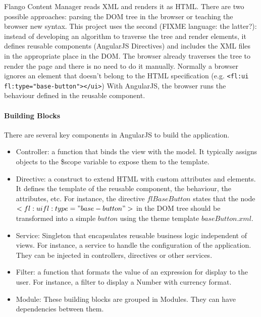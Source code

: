 Flango Content Manager reads \ac{XML} and renders it as \ac{HTML}.
There are two possible approaches: parsing the \ac{DOM} tree in the browser or teaching the browser new syntax.
This project uses the second (FIXME language: the latter?): instead of developing an algorithm to traverse the tree and render elements, it defines reusable components (AngularJS Directives) and includes the \ac{XML} files in the appropriate place in the \ac{DOM}. 
The browser already traverses the tree to render the page and there is no need to do it manually.
Normally a browser ignores an element that doesn't belong to the \ac{HTML} specification (e.g. \lstinline$<fl:ui fl:type="base-button"></ui>$)
With AngularJS, the browser runs the behaviour defined in the reusable component.

\paragraph{Building Blocks} There are several key components in AngularJS to build the application.

\begin{itemize}
    \item Controller: a function that binds the view with the model. It typically assigns objects to the \$scope variable to expose them to the template.
    \item Directive: a construct to extend HTML with custom attributes and elements. It defines the template of the reusable component, the behaviour, the attributes, etc. For instance, the directive $flBaseButton$ states that the node $<fl:ui fl:type="base-button">$ in the \ac{DOM} tree should be transformed into a simple $button$ using the theme template $baseButton.xml$. 
    \item Service: Singleton that encapsulates reusable business logic independent of views. For instance, a service to handle the configuration of the application. They can be injected in controllers, directives or other services.
    \item Filter: a function that formats the value of an expression for display to the user. For instance, a filter to display a Number with currency format.
    \item Module: These building blocks are grouped in Modules. They can have dependencies between them.
\end{itemize}

